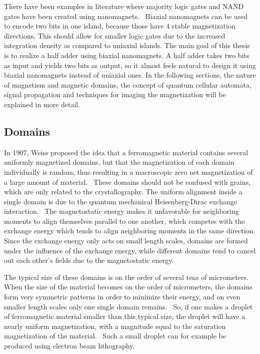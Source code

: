 \documentclass[12pt,a4paper]{article}
\begin{document}
There have been examples in literature where majority logic gates and NAND gates have been created using nanomagnets.~\cite{GYP-18} Biaxial nanomagnets can be used to encode two bits in one island, because those have 4 stable magnetization directions. This should allow for smaller logic gates due to the increased integration density as compared to uniaxial islands. The main goal of this thesis is to realize a half adder using biaxial nanomagnets. A half adder takes two bits as input and yields two bits as output, so it almost feels natural to design it using biaxial nanomagnets instead of uniaxial ones.
In the following sections, the nature of magnetism and magnetic domains, the concept of quantum cellular automata, signal propagation and techniques for imaging the magnetization will be explained in more detail.

\subsection{Domains}
In 1907, Weiss proposed the idea that a ferromagnetic material contains several uniformly magnetized domains, but that the magnetization of each domain individually is random, thus resulting in a macroscopic zero net magnetization of a large amount of material.~\cite{MuMax3_advances} These domains should not be confused with grains, which are only related to the crystallography. The uniform alignment inside a single domain is due to the quantum mechanical Heisenberg-Dirac exchange interaction.~\cite{MuMax3_advances, heisenberg1928theorie} The magnetostatic energy makes it unfavorable for neighboring moments to align themselves parallel to one another, which competes with the exchange energy which tends to align neighboring moments in the same direction. Since the exchange energy only acts on small length scales, domains are formed under the influence of the exchange energy, while different domains tend to cancel out each other's fields due to the magnetostatic energy. \par
The typical size of these domains is on the order of several tens of micrometers. When the size of the material becomes on the order of micrometers, the domains form very symmetric patterns in order to minimize their energy, and on even smaller length scales only one single domain remains.~\cite{NML_Carlton} So, if one makes a droplet of ferromagnetic material smaller than this typical size, the droplet will have a nearly uniform magnetization, with a magnitude equal to the saturation magnetization of the material.~\cite{NML_Carlton} Such a small droplet can for example be produced using electron beam lithography.~\cite{MQCA_RoomTemp, NML_Carlton} \par
\end{document}
